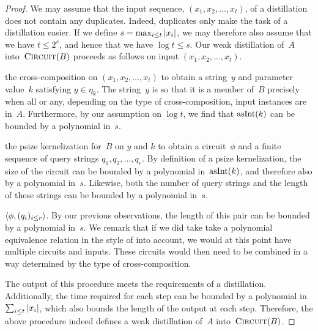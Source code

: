 \begin{proof}
  We may assume that the input sequence, $(x_1, x_2, \ldots, x_t)$, of a distillation does not contain any duplicates.
  Indeed, duplicates only make the task of a distillation easier.
  If we define $s = \max_{i \le t} {\lvert x_i\rvert}$, we may therefore also assume that we have $t \le 2^s$, and hence that we have $\log t \le s$.
  Our weak distillation of~$A$ into~$\textnormal{\textsc{Circuit}}(B)$ proceeds as follows on input $(x_1, x_2, \ldots, x_t)$.
  \begin{codelisting}
  \item
     the cross-composition on $(x_1, x_2, \ldots, x_t)$ to obtain a string~$y$ and parameter value~$k$ satisfying $y \in \eta_k$.
    The string~$y$ is so that it is a member of~$B$ precisely when all or any, depending on the type of cross-composition, input instances are in~$A$.
    Furthermore, by our assumption on $\log t$, we find that $\asNat(k)$ can be bounded by a polynomial in~$s$.
  \item
     the psize kernelization for~$B$ on $y$ and $k$ to obtain a circuit~$\phi$ and a finite sequence of query strings $q_1, q_2, \ldots, q_r$.
    By definition of a psize kernelization, the size of the circuit can be bounded by a polynomial in~$\asNat(k)$, and therefore also by a polynomial in~$s$.
    Likewise, both the number of query strings and the length of these strings can be bounded by a polynomial in~$s$.
  \item
     $\pair{\phi}{(q_i)_{i \le r}}$.
    By our previous observations, the length of this pair can be bounded by a polynomial in~$s$.
    We remark that if we did take take a polynomial equivalence relation in the style of \textcite{bodlaender2014kernelization} into account, we would at this point have multiple circuits and inputs.
    These circuits would then need to be combined in a way determined by the type of cross-composition.
  \end{codelisting}

  The output of this procedure meets the requirements of a distillation.
  Additionally, the time required for each step can be bounded by a polynomial in $\sum_{i \le t} {\lvert x_i\rvert}$, which also bounds the length of the output at each step.
  Therefore, the above procedure indeed defines a weak distillation of~$A$ into~$\textnormal{\textsc{Circuit}}(B)$.
\end{proof}

